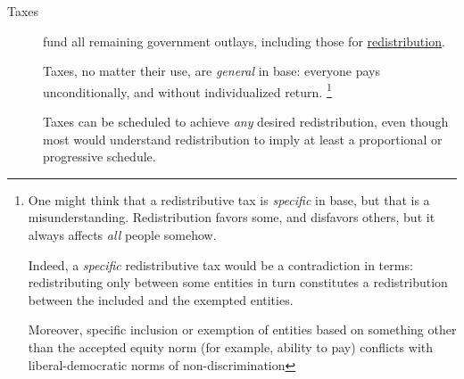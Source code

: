 \begin{description}
	\item[Taxes]
		\label{sec:taxes}
	fund all remaining government outlays, including those for \hyperref[sec:redistributive-policy]{redistribution}.

	Taxes, no matter their use, are \emph{general} in base:
	everyone pays unconditionally, and without individualized return.
	\footnote{
		One might think that a redistributive tax is \emph{specific} in base, but that is a misunderstanding.
		Redistribution favors some, and disfavors others, but it always affects \emph{all} people somehow.

		Indeed, a \emph{specific} redistributive tax would be a contradiction in terms:
		redistributing only between some entities in turn constitutes a redistribution between the included and the exempted entities.

		Moreover, specific inclusion or exemption of entities based on something other than the accepted equity norm (for example, ability to pay) conflicts with liberal-democratic norms of non-discrimination
	}

	Taxes can be scheduled to achieve \emph{any} desired redistribution, even though most would understand redistribution to imply at least a proportional or progressive schedule.



\end{description}
